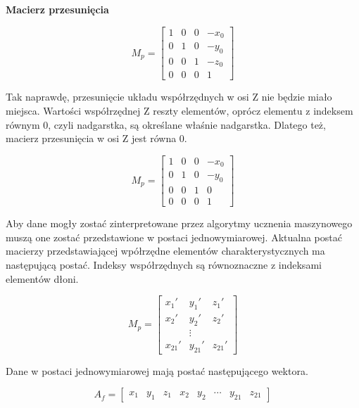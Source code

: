     \quad \textbf{Macierz przesunięcia}
    
    \begin{equation*}
        M_p = 
        \begin{bmatrix}
        1 & 0 & 0 & -x_0 \\
        0 & 1 & 0 & -y_0 \\
        0 & 0 & 1 & -z_0 \\
        0 & 0 & 0 & 1
        \end{bmatrix}
    \end{equation*}

    \quad Tak naprawdę, przesunięcie układu współrzędnych w osi Z nie będzie miało miejsca. Wartości współrzędnej Z reszty elementów, oprócz elementu z indeksem równym 0, czyli nadgarstka, są określane właśnie nadgarstka. Dlatego też, macierz przesunięcia w osi Z jest równa 0. 

    \begin{equation*}
        M_p = 
        \begin{bmatrix}
        1 & 0 & 0 & -x_0 \\
        0 & 1 & 0 & -y_0 \\
        0 & 0 & 1 & 0 \\
        0 & 0 & 0 & 1
        \end{bmatrix}
    \end{equation*}
    
    \quad Aby dane mogły zostać zinterpretowane przez algorytmy ucznenia maszynowego muszą one zostać przedstawione w postaci jednowymiarowej. Aktualna postać macierzy przedstawiającej wpółrzędne elementów charakterystycznych ma następującą postać. Indeksy współrzędnych są równoznaczne z indeksami elementów dłoni. 
    
    \begin{equation*}
        M_p = 
        \begin{bmatrix}
        x_1' & y_1' & z_1' \\
        x_2' & y_2' & z_2' \\
         & \vdots &     \\
        x_{21}' & y_{21}' & z_{21}'
        \end{bmatrix}
    \end{equation*}
    
    Dane w postaci jednowymiarowej mają postać następującego wektora. 
    
    \begin{equation*}
        A_f=
        \begin{bmatrix}
            x_1 & y_1 & z_1 & x_2 & y_2 & \cdots & y_{21} & z_{21}
        \end{bmatrix}
    \end{equation*}
    
